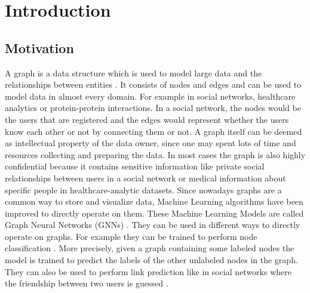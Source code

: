 \chapter{Introduction}


	\section{Motivation}

		A graph is a data structure which is used to model large data and the relationships between entities \cite{DBLP:journals/corr/abs-2005-00687, cook2006mining}.
		It consists of nodes and edges and can be used to model data in almost every domain.
		For example in social networks, healthcare analytics or protein-protein interactions.
		In a social network, the nodes would be the users that are registered and the edges would represent whether the users know each other or not by connecting them or not.
		A graph itself can be deemed as intellectual property of the data owner, since one may spent lots of time and resources collecting and preparing the data.
		In most cases the graph is also highly confidential because it contains sensitive information like private social relationships between users in a social network or medical information about specific people in healthcare-analytic datasets.
		Since nowadays graphs are a common way to store and visualize data, Machine Learning algorithms have been improved to directly operate on them.
		These Machine Learning Models are called Graph Neural Networks (GNNs) \cite{atwood2016diffusionconvolutional, defferrard2017convolutional}.
		They can be used in different ways to directly operate on graphs.
		For example they can be trained to perform node classification \cite{kipf2017semisupervised}.
		More precisely, given a graph containing some labeled nodes the model is trained to predict the labels of the other unlabeled nodes in the graph.
		They can also be used to perform link prediction like in social networks where the friendship between two users is guessed \cite{zhang2018link}.

